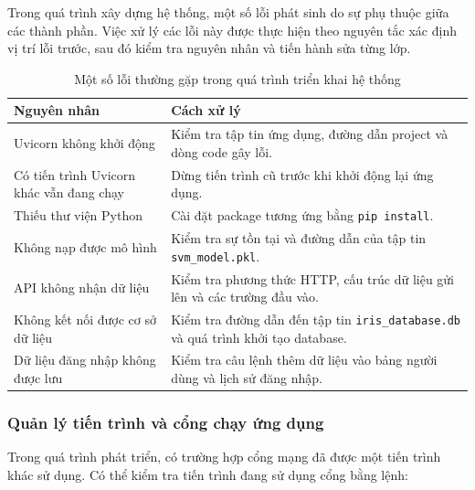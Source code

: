 \documentclass[14pt]{extarticle}
\begin{document}
	\noindent Trong quá trình xây dựng hệ thống, một số lỗi phát sinh do sự phụ thuộc giữa các thành phần. Việc xử lý các lỗi này được thực hiện theo nguyên tắc xác định vị trí lỗi trước, sau đó kiểm tra nguyên nhân và tiến hành sửa từng lớp.
	
	\begin{table}[H]
		\centering
		\caption{Một số lỗi thường gặp trong quá trình triển khai hệ thống}

		\begin{tabular}{|p{4.2cm}|p{8.5cm}|}
			\hline
			\textbf{Nguyên nhân} & \textbf{Cách xử lý} \\ \hline
			
			Uvicorn không khởi động &
			Kiểm tra tập tin ứng dụng, đường dẫn project và dòng code gây lỗi. \\ \hline
			
			Có tiến trình Uvicorn khác vẫn đang chạy &
			Dừng tiến trình cũ trước khi khởi động lại ứng dụng. \\ \hline
			
			Thiếu thư viện Python &
			Cài đặt package tương ứng bằng \texttt{pip install}. \\ \hline
			
			Không nạp được mô hình &
			Kiểm tra sự tồn tại và đường dẫn của tập tin \texttt{svm\_model.pkl}. \\ \hline
			
			API không nhận dữ liệu &
			Kiểm tra phương thức HTTP, cấu trúc dữ liệu gửi lên và các trường đầu vào. \\ \hline
			
			Không kết nối được cơ sở dữ liệu &
			Kiểm tra đường dẫn đến tập tin \texttt{iris\_database.db} và quá trình khởi tạo database. \\ \hline
			
			Dữ liệu đăng nhập không được lưu &
			Kiểm tra câu lệnh thêm dữ liệu vào bảng người dùng và lịch sử đăng nhập. \\ \hline
			
		\end{tabular}
	\end{table}
	\newpage
	
	\subsubsection{Quản lý tiến trình và cổng chạy ứng dụng}
	
	\noindent Trong quá trình phát triển, có trường hợp cổng mạng đã được một tiến trình khác sử dụng. Có thể kiểm tra tiến trình đang sử dụng cổng bằng lệnh:
	
\end{document}
